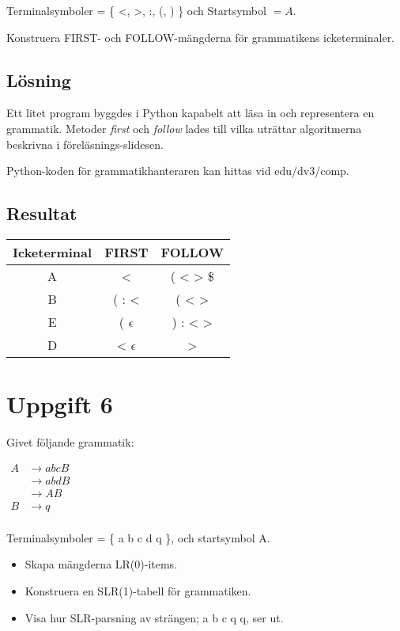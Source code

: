 \documentclass[10pt, titlepage, oneside, a4paper]{article}
\newcommand{\Section}[1]{\section{#1}\vspace{-4pt}}
\def\path{edu/dv3/comp}
\begin{document}
Terminalsymboler =  \{ <, >, :, (, ) \} och Startsymbol $= A$.

Konstruera FIRST- och FOLLOW-mängderna för grammatikens icketerminaler.
		
	\subsection{Lösning}
		Ett litet program byggdes i Python kapabelt att läsa in och representera en grammatik. Metoder \textit{first} och \textit{follow} lades till vilka uträttar algoritmerna beskrivna i föreläsnings-slidesen.
		
		Python-koden för grammatikhanteraren kan hittas vid \path.
			
	\subsection{Resultat}
	
		\begin{center}
		\begin{table}[h!]
		\begin{tabular}{ c | c | c}
		\textbf{Icketerminal} & \textbf{FIRST} & \textbf{FOLLOW} \\ \hline
		A & < & ( < > \$ \\
		B & ( : <  & ( < > \\
		E & ( $\epsilon$ & ) : < >\\
		D & < $\epsilon$ & > \\
		
		\end{tabular}
		\end{table}
		\end{center}
						

		\pagebreak

	\Section{ Uppgift 6 }
	
	Givet följande grammatik:
	
		$\begin{aligned} 
			A & \to a b c B \\
			 & \to a b d B \\
			 & \to A B \\
			B & \to q \\
		\end{aligned}$
		
	Terminalsymboler  = \{ a b c d q \}, och startsymbol A.
	
	\begin{itemize}

	\item Skapa mängderna LR(0)-items.
	\item Konstruera en SLR(1)-tabell för grammatiken.
	\item Visa hur SLR-parsning av strängen; a b c q q, ser ut.	
	
	\end{itemize}
		
\end{document}
